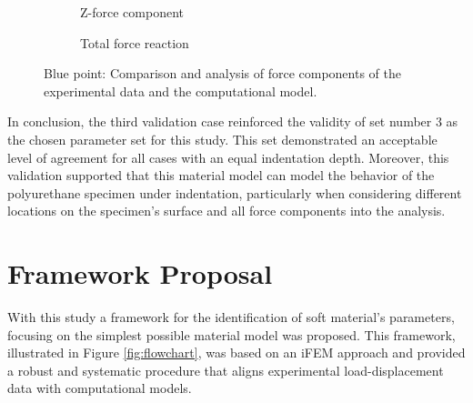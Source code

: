 \begin{figure}[htbp]
\begin{subfigure}[b]{0.45\textwidth}
    \caption{Z-force component}
    \end{subfigure}  
    \hspace{0.3cm}
    \begin{subfigure}[b]{0.45\textwidth}
    \centering
    \caption{Total force reaction}
    \end{subfigure}
    
    \caption[Blue point force components comparison]{Blue point: Comparison and analysis of force components of the experimental data and the computational model.}
    \label{fig:bpforcecompvc}
\end{figure}

In conclusion, the third validation case reinforced the validity of set number
\SI{3}{} as the chosen parameter set for this study. This set 
demonstrated an acceptable level of agreement for all cases with an equal 
indentation depth. Moreover, this validation supported that this material model 
can model the behavior of the polyurethane specimen under indentation, particularly
when considering different locations on the specimen's surface and all 
force components into the analysis.
\section{Framework Proposal}
With this study a framework for the identification of soft material's parameters, focusing on the 
simplest possible material model was proposed. This framework, illustrated in Figure \ref{fig:flowchart}, 
was based on an iFEM approach and provided a robust and systematic procedure that aligns experimental 
load-displacement data with computational models.\\

